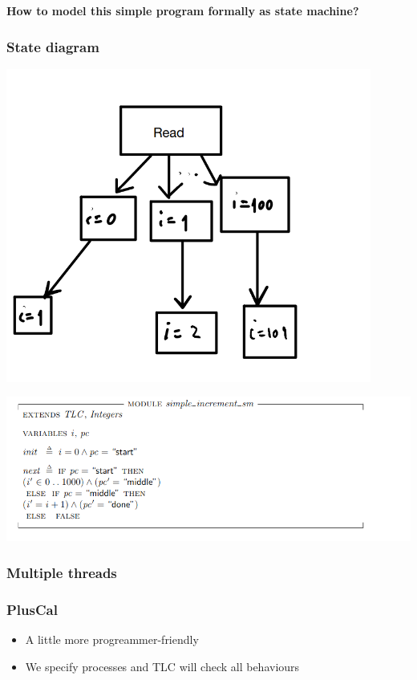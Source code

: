\documentclass{beamer}
\begin{document}
\begin{frame}
    \begin{center}
        \LARGE{\textbf{How to model this simple program formally as state machine?}}
    \end{center}

\end{frame}

\begin{frame}
    \frametitle{State diagram}
    \includegraphics[width=0.9\textwidth, height=0.9\textheight]{img/1.png}
\end{frame}



\begin{frame}[fragile]
    \includegraphics[width=\textwidth]{./sm_increment.png}
\end{frame}

\begin{frame}
    \frametitle{Multiple threads}
\end{frame}

\begin{frame}
    \frametitle{PlusCal}
    \begin{itemize}
        \item A little more progreammer-friendly 
        \item We specify processes and TLC will check all behaviours
    \end{itemize}
\end{frame}
\end{document}
